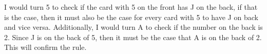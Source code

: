 \documentclass[a4paper]{exam}
\begin{document}
\begin{questions}
  \begin{solution}
    
    I would turn 5 to check if the card with 5 on the front has J on the back, if that is the case, then it must also be the case for every card with 5 to have J on back and vice versa.
    Additionally, I would turn A to check if the number on the back is 2. Since J is on the back of 5, then it must be the case that A is on the back of 2. This will confirm the rule.
  \end{solution}

  
\end{questions}
\end{document}
